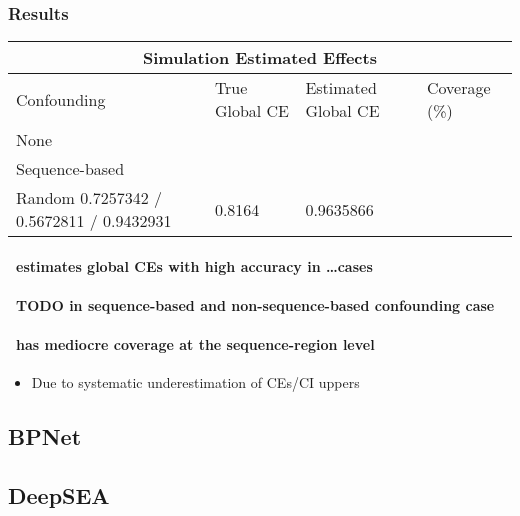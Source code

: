 \subsubsection{Results}%
\label{ssub:sim_results}
\begin{tabular}{ |p{3cm}||p{5cm}|p{5cm}|p{3cm}|  }
 \hline
 \multicolumn{4}{|c|}{Simulation Estimated Effects} \\
 \hline
 Confounding & True Global CE & Estimated Global CE & Coverage (\%) \\
 \hline
 None   &     & &   \\
 \hline
 Sequence-based & &  & \\
 \hline
 Random 0.7257342 / 0.5672811 / 0.9432931 & 0.8164 & 0.9635866 & \\
 \hline
\end{tabular}

\paragraph{\method\ estimates global CEs with high accuracy in \dots cases}%
\label{par:sim_res_1}

\paragraph{\method\ TODO in sequence-based and non-sequence-based confounding case}

\paragraph{\method\ has mediocre coverage at the sequence-region level}
\begin{itemize}
	\item Due to systematic underestimation of CEs/CI uppers
\end{itemize}


\subsection{BPNet}

\subsection{DeepSEA}


